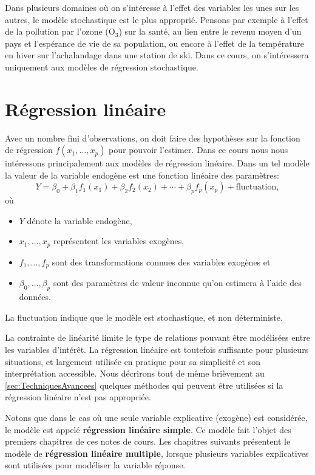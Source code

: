 Dans plusieurs domaines où on s'intéresse à l'effet des variables les unes sur les autres, le modèle stochastique est le plus approprié. Pensons par exemple à l'effet de la pollution par l'ozone (O$_3$) sur la santé, au lien entre le revenu moyen d'un pays et l'espérance de vie de sa population, ou encore à l'effet de la température en hiver sur l'achalandage dans une station de ski. Dans ce cours, on s'intéressera uniquement aux modèles de régression stochastique.



\section{Régression linéaire}


Avec un nombre fini d'observations, on doit faire des hypothèses sur la fonction de régression $f(x_1,\ldots,x_p)$ pour pouvoir l'estimer. Dans ce cours nous nous intéressons principalement aux modèles de régression linéaire.
Dans un tel modèle la valeur de la variable endogène est une fonction linéaire des paramètres:
\begin{equation}\label{eq:regresslin}
Y=\beta_0+\beta_1f_1(x_1)+\beta_2f_2(x_2)+\cdots+\beta_pf_p(x_p)+
\mbox{fluctuation},
\end{equation}
où 
\begin{itemize}
    \item $Y$ dénote la variable endogène, 
    \item $x_1,\ldots,x_p$ représentent les variables exogènes, 
    \item $f_1,\ldots,f_{p}$ sont des transformations connues des variables exogènes et 
    \item $\beta_0,\ldots,\beta_p$ sont des paramètres de valeur
inconnue qu'on estimera à l'aide des données.
\end{itemize}
La fluctuation indique que le modèle est stochastique, et non déterministe.

La contrainte de linéarité limite le type de relations pouvant être modélisées entre les variables d'intérêt. La régression linéaire est toutefois suffisante pour plusieurs situations, et largement utilisée en pratique pour sa simplicité et son interprétation accessible. Nous décrirons tout de même brièvement au  \autoref{sec:TechniquesAvancees}  quelques méthodes qui peuvent être utilisées si la régression linéaire n'est pas appropriée.

Notons que dans le cas où une seule variable explicative (exogène) est considérée, le modèle est appelé \textbf{régression linéaire simple}. Ce modèle fait l'objet des premiers chapitres de ces notes de cours. Les chapitres suivants présentent le modèle de \textbf{régression linéaire multiple}, lorsque plusieurs variables explicatives sont utilisées pour modéliser la variable réponse.


